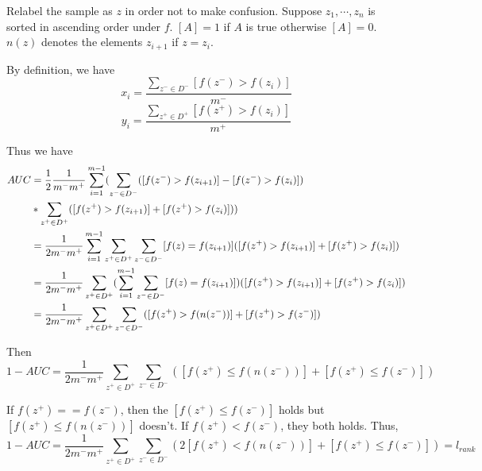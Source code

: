 	\begin{solution}
		Relabel the sample as $z$ in order not to make confusion. Suppose $z_1,\cdots,z_n$ is sorted in ascending order under $f$. $[A]=1$ if $A$ is true otherwise $[A]=0$. $n(z)$ denotes the elements $z_{i+1}$ if $z=z_i$.

		By definition, we have
		\[x_i=\frac{\sum_{z^-\in D^-}[f(z^-)>f(z_i)]}{m^-}\]
		\[y_i=\frac{\sum_{z^+\in D^+}[f(z^+)>f(z_i)]}{m^+}\]

		Thus we have
		\begin{align}
			AUC & = \frac{1}{2}\frac{1}{m^-m^+}\sum_{i=1}^{m-1}(\sum_{z^-\in D^-}([f(z^-)>f(z_{i+1})]-[f(z^-)>f(z_i)])
			\notag \\ 
			&*\sum_{z^+\in D^+}([f(z^+)>f(z_{i+1})]+[f(z^+)>f(z_{i})])) \notag \\
			& = \frac{1}{2m^-m^+}\sum_{i=1}^{m-1}\sum_{z^+\in D^+}\sum_{z^-\in D^-}[f(z)=f(z_{i+1})]([f(z^+)>f(z_{i+1})]+[f(z^+)>f(z_{i})]) \notag \\
			& = \frac{1}{2m^-m^+}\sum_{z^+\in D^+}(\sum_{i=1}^{m-1}\sum_{z^-\in D^-}[f(z)=f(z_{i+1})])([f(z^+)>f(z_{i+1})]+[f(z^+)>f(z_{i})]) \notag \\
			& = \frac{1}{2m^-m^+}\sum_{z^+\in D^+}\sum_{z^-\in D^-}([f(z^+)>f(n(z^-))]+[f(z^+)>f(z^-)])\notag
		\end{align}

		Then 
		\[1-AUC = \frac{1}{2m^-m^+}\sum_{z^+\in D^+}\sum_{z^-\in D^-}([f(z^+)\leq f(n(z^-))]+[f(z^+)\leq f(z^-)])\]

		If $f(z^+)==f(z^-)$, then the $[f(z^+)\leq f(z^-)]$ holds but $[f(z^+)\leq f(n(z^-))]$ doesn't. If $f(z^+)<f(z^-)$, they both holds. Thus,
		\[1-AUC = \frac{1}{2m^-m^+}\sum_{z^+\in D^+}\sum_{z^-\in D^-}(2[f(z^+)< f(n(z^-))]+[f(z^+)\leq f(z^-)])=l_{rank}\]
	\end{solution}
	
